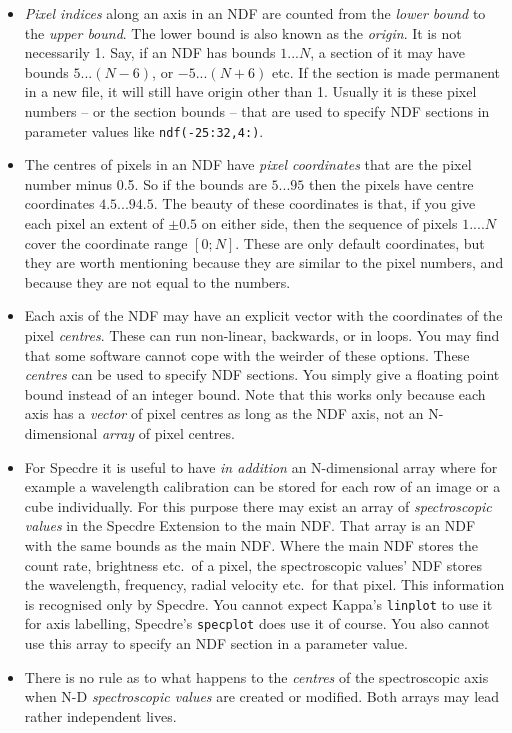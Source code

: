 \begin{itemize}
\item {\it Pixel indices} along an axis in an NDF are counted from the
   {\it lower bound} to the {\it upper bound}.  The lower bound is also
   known as the {\it origin}.  It is not necessarily 1.  Say, if an NDF
   has bounds $1 ... N$, a section of it may have bounds $5 ... (N-6)$, or
   $-5 ... (N+6)$ etc.  If the section is made permanent in a new file, it
   will still have origin other than 1.  Usually it is these pixel
   numbers -- or the section bounds -- that are used to specify NDF
   sections in parameter values like {\tt ndf(-25:32,4:)}.

\item The centres of pixels in an NDF have {\it pixel coordinates} that
   are the pixel number minus 0.5.  So if the bounds are $5 ... 95$ then
   the pixels have centre coordinates $4.5 ... 94.5$.  The beauty of
   these coordinates is that, if you give each pixel an extent of $\pm
   0.5$ on either side, then the sequence of pixels $1 .... N$ cover the
   coordinate range $[0;N]$.  These are only default coordinates, but
   they are worth mentioning because they are similar to the pixel
   numbers, and because they are not equal to the numbers.

\item Each axis of the NDF may have an explicit vector with the
   coordinates of the pixel {\it centres}.  These can run non-linear,
   backwards, or in loops.  You may find that some software cannot cope
   with the weirder of these options.  These {\it centres} can be used
   to specify NDF sections.  You simply give a floating point bound
   instead of an integer bound.  Note that this works only because each
   axis has a {\it vector} of pixel centres as long as the NDF axis, not
   an N-dimensional {\it array} of pixel centres.

\item For Specdre it is useful to have {\it in addition} an
   N-dimensional array where for example a wavelength calibration can be
   stored for each row of an image or a cube individually.  For this
   purpose there may exist an array of {\it spectroscopic values} in the
   Specdre Extension to the main NDF.  That array is an NDF with the
   same bounds as the main NDF.  Where the main NDF stores the count
   rate, brightness etc.\ of a pixel, the spectroscopic values' NDF
   stores the wavelength, frequency, radial velocity etc.\ for that
   pixel.  This information is recognised only by Specdre.  You cannot
   expect Kappa's {\tt linplot} to use it for axis labelling, Specdre's
   {\tt specplot} does use it of course.  You also cannot use this array
   to specify an NDF section in a parameter value.

\item There is no rule as to what happens to the {\it centres} of the
   spectroscopic axis when N-D {\it spectroscopic values} are created or
   modified.  Both arrays may lead rather independent lives.
\end{itemize}


